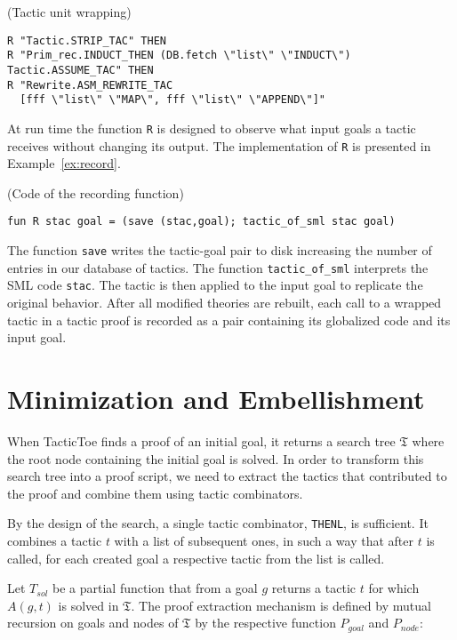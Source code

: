\documentclass[runningheads,a4paper,draft]{svjour3}
\def\sml{\textsf{SML}\xspace}
\def\tactictoe{\textsf{TacticToe}\xspace}
\begin{document}
\begin{example}\label{ex:wrap} (Tactic unit wrapping)
\begin{lstlisting}[language=SMLSmall]
R "Tactic.STRIP_TAC" THEN
R "Prim_rec.INDUCT_THEN (DB.fetch \"list\" \"INDUCT\") Tactic.ASSUME_TAC" THEN
R "Rewrite.ASM_REWRITE_TAC
  [fff \"list\" \"MAP\", fff \"list\" \"APPEND\"]"
\end{lstlisting}
\end{example}

At run time the function \texttt{R} is designed to observe what input goals a
tactic  receives without changing its output. The implementation of \texttt{R}
is presented in Example~\ref{ex:record}.

\begin{example}\label{ex:record} (Code of the recording function)
\begin{lstlisting}[language=SMLSmall]
fun R stac goal = (save (stac,goal); tactic_of_sml stac goal)
\end{lstlisting}
\end{example}

The function \texttt{save} writes the tactic-goal pair to disk increasing the
number of entries in our database of tactics. The function
\texttt{tactic\_of\_sml} interprets the \sml code \texttt{stac}. The tactic is
then applied to the input goal to replicate the original behavior.
After all modified theories are rebuilt, each call to a wrapped tactic in a
tactic proof is recorded as a pair containing its globalized code and its
input goal.



\section{Minimization and Embellishment}\label{sec:proofdisplay}

When \tactictoe finds a proof of an initial goal, it returns a search tree
$\mathfrak{T}$ where the root node containing the initial goal is solved.
In order to transform this search tree into a proof script, we need to extract
the tactics that contributed to the proof and combine them using tactic
combinators.

By the design of the search, a single tactic combinator, \texttt{THENL}, is
sufficient. It combines a tactic $t$ with a list of subsequent ones, in such a
way that after $t$ is called, for each created goal a respective
tactic from the list is called.

Let $T_{sol}$ be a partial function that from a goal $g$ returns a tactic $t$
for which $A(g,t)$ is solved in $\mathfrak{T}$.
The proof extraction mechanism is defined by mutual
recursion on goals and nodes of $\mathfrak{T}$ by the respective function
$P_{goal}$ and $P_{node}$:
\end{document}
